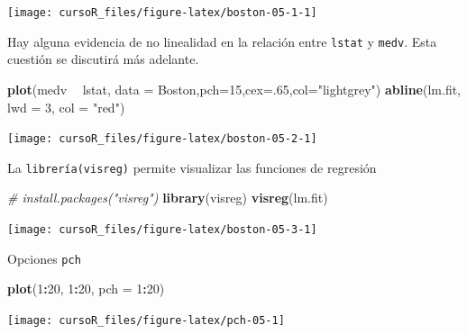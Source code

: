 \documentclass[]{book}
\newenvironment{Shaded}{\begin{snugshade}}{\end{snugshade}}
\newcommand{\KeywordTok}[1]{\textcolor[rgb]{0.13,0.29,0.53}{\textbf{#1}}}
\newcommand{\DataTypeTok}[1]{\textcolor[rgb]{0.13,0.29,0.53}{#1}}
\newcommand{\DecValTok}[1]{\textcolor[rgb]{0.00,0.00,0.81}{#1}}
\newcommand{\StringTok}[1]{\textcolor[rgb]{0.31,0.60,0.02}{#1}}
\newcommand{\CommentTok}[1]{\textcolor[rgb]{0.56,0.35,0.01}{\textit{#1}}}
\newcommand{\OperatorTok}[1]{\textcolor[rgb]{0.81,0.36,0.00}{\textbf{#1}}}
\newcommand{\NormalTok}[1]{#1}
\begin{document}
\begin{center}\texttt{[image: cursoR\_files/figure-latex/boston-05-1-1]} \end{center}

Hay alguna evidencia de no linealidad en la relación entre
\texttt{lstat} y \texttt{medv}. Esta cuestión se discutirá más adelante.

\begin{Shaded}
\begin{Highlighting}[]
\KeywordTok{plot}\NormalTok{(medv }\OperatorTok{~}\StringTok{ }\NormalTok{lstat, }\DataTypeTok{data =}\NormalTok{ Boston,}\DataTypeTok{pch=}\DecValTok{15}\NormalTok{,}\DataTypeTok{cex=}\NormalTok{.}\DecValTok{65}\NormalTok{,}\DataTypeTok{col=}\StringTok{"lightgrey"}\NormalTok{)}
\KeywordTok{abline}\NormalTok{(lm.fit, }\DataTypeTok{lwd =} \DecValTok{3}\NormalTok{, }\DataTypeTok{col =} \StringTok{"red"}\NormalTok{)}
\end{Highlighting}
\end{Shaded}

\begin{center}\texttt{[image: cursoR\_files/figure-latex/boston-05-2-1]} \end{center}

La \texttt{librería(visreg)} permite visualizar las funciones de
regresión

\begin{Shaded}
\begin{Highlighting}[]
\CommentTok{# install.packages("visreg")}
\KeywordTok{library}\NormalTok{(visreg)}
\KeywordTok{visreg}\NormalTok{(lm.fit)}
\end{Highlighting}
\end{Shaded}

\begin{center}\texttt{[image: cursoR\_files/figure-latex/boston-05-3-1]} \end{center}

Opciones \texttt{pch}

\begin{Shaded}
\begin{Highlighting}[]
\KeywordTok{plot}\NormalTok{(}\DecValTok{1}\OperatorTok{:}\DecValTok{20}\NormalTok{, }\DecValTok{1}\OperatorTok{:}\DecValTok{20}\NormalTok{, }\DataTypeTok{pch =} \DecValTok{1}\OperatorTok{:}\DecValTok{20}\NormalTok{)}
\end{Highlighting}
\end{Shaded}

\begin{center}\texttt{[image: cursoR\_files/figure-latex/pch-05-1]} \end{center}
\end{document}
